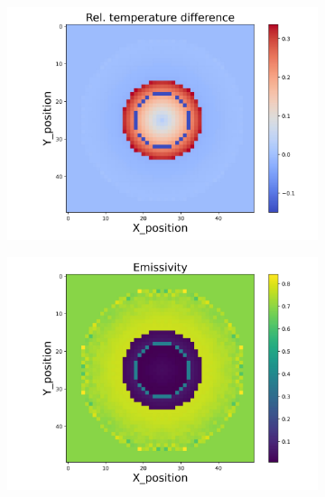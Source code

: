 \begin{figure}[htbp]
    \centering
    \begin{minipage}{\textwidth}
        \centering
        \begin{subfigure}{0.49\textwidth}
            \centering
            \includegraphics[width=\textwidth]{figures/raw_data/21/quad/T_bias.jpg}
        \end{subfigure}
        \begin{subfigure}{0.49\textwidth}
            \centering
            \includegraphics[width=\textwidth]{figures/raw_data/21/quad/emi_cal.jpg}
        \end{subfigure}
    \end{minipage}\\

\end{figure}
